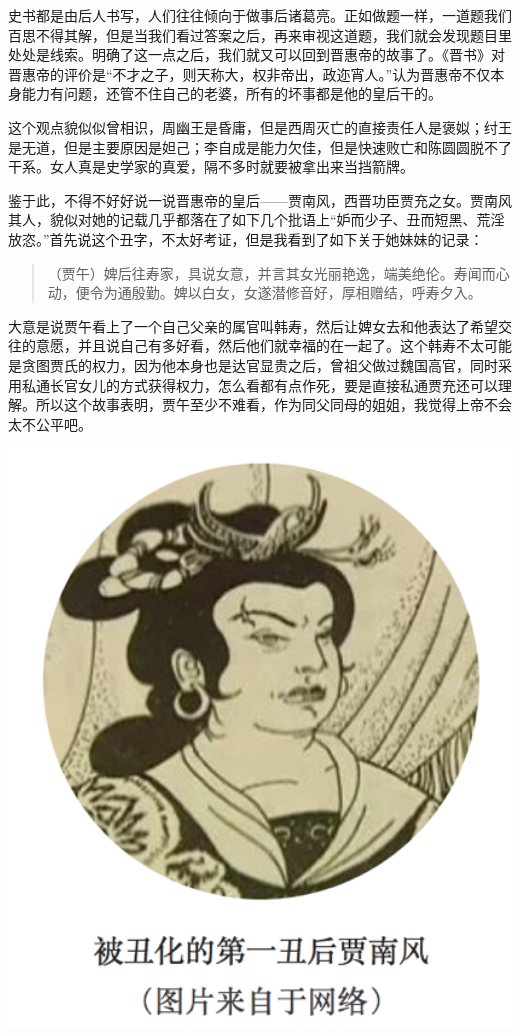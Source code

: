 \documentclass[]{book}
\begin{document}
史书都是由后人书写，人们往往倾向于做事后诸葛亮。正如做题一样，一道题我们百思不得其解，但是当我们看过答案之后，再来审视这道题，我们就会发现题目里处处是线索。明确了这一点之后，我们就又可以回到晋惠帝的故事了。《晋书》对晋惠帝的评价是``不才之子，则天称大，权非帝出，政迩宵人。''认为晋惠帝不仅本身能力有问题，还管不住自己的老婆，所有的坏事都是他的皇后干的。

这个观点貌似似曾相识，周幽王是昏庸，但是西周灭亡的直接责任人是褒姒；纣王是无道，但是主要原因是妲己；李自成是能力欠佳，但是快速败亡和陈圆圆脱不了干系。女人真是史学家的真爱，隔不多时就要被拿出来当挡箭牌。

鉴于此，不得不好好说一说晋惠帝的皇后------贾南风，西晋功臣贾充之女。贾南风其人，貌似对她的记载几乎都落在了如下几个批语上``妒而少子、丑而短黑、荒淫放恣。''首先说这个丑字，不太好考证，但是我看到了如下关于她妹妹的记录：

\begin{quote}
（贾午）婢后往寿家，具说女意，并言其女光丽艳逸，端美绝伦。寿闻而心动，便令为通殷勤。婢以白女，女遂潜修音好，厚相赠结，呼寿夕入。
\end{quote}

大意是说贾午看上了一个自己父亲的属官叫韩寿，然后让婢女去和他表达了希望交往的意愿，并且说自己有多好看，然后他们就幸福的在一起了。这个韩寿不太可能是贪图贾氏的权力，因为他本身也是达官显贵之后，曾祖父做过魏国高官，同时采用私通长官女儿的方式获得权力，怎么看都有点作死，要是直接私通贾充还可以理解。所以这个故事表明，贾午至少不难看，作为同父同母的姐姐，我觉得上帝不会太不公平吧。

\includegraphics[width=5.79in]{images/his7}
\end{document}
